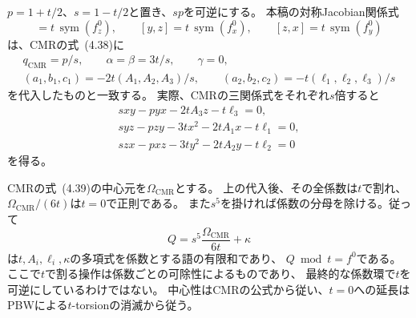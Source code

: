 \begin{remark}[節点型の既知の明示中心元との関係]
$p=1+t/2$、$s=1-t/2$と置き、$sp$を可逆にする。
本稿の対称Jacobian関係式
\begin{equation}
 [x,y]=t\,\operatorname{sym}(f^0_z),\qquad
 [y,z]=t\,\operatorname{sym}(f^0_x),\qquad
 [z,x]=t\,\operatorname{sym}(f^0_y)
 \label{eq:pg-cmr-jacobian-relations}
\end{equation}
は、CMRの式~(4.38)に
\begin{equation}
 \begin{gathered}
 q_{\mathrm{CMR}}=p/s,\qquad
 \alpha=\beta=3t/s,\qquad \gamma=0,\\
 (a_1,b_1,c_1)=-2t(A_1,A_2,A_3)/s,\qquad
 (a_2,b_2,c_2)=-t(\ell_1,\ell_2,\ell_3)/s
 \end{gathered}
 \label{eq:pg-cmr-parameter-comparison}
\end{equation}
を代入したものと一致する。
実際、CMRの三関係式をそれぞれ$s$倍すると
\begin{equation}
 \begin{gathered}
 sxy-pyx-2tA_3z-t\ell_3=0,\\
 syz-pzy-3tx^2-2tA_1x-t\ell_1=0,\\
 szx-pxz-3ty^2-2tA_2y-t\ell_2=0
 \end{gathered}
 \label{eq:pg-cmr-comparison-relations}
\end{equation}
を得る。

CMRの式~(4.39)の中心元を$\Omega_{\mathrm{CMR}}$とする。
上の代入後、その全係数は$t$で割れ、
$\Omega_{\mathrm{CMR}}/(6t)$は$t=0$で正則である。
また$s^5$を掛ければ係数の分母を除ける。従って
\begin{equation}
 Q=s^5\frac{\Omega_{\mathrm{CMR}}}{6t}+\kappa
 \label{eq:pg-cmr-normalized-center}
\end{equation}
は$t,A_i,\ell_i,\kappa$の多項式を係数とする語の有限和であり、
$Q\bmod t=f^0$である。
ここで$t$で割る操作は係数ごとの可除性によるものであり、
最終的な係数環で$t$を可逆にしているわけではない。
中心性はCMRの公式から従い、$t=0$への延長はPBWによる$t$-torsionの消滅から従う。


\end{remark}
